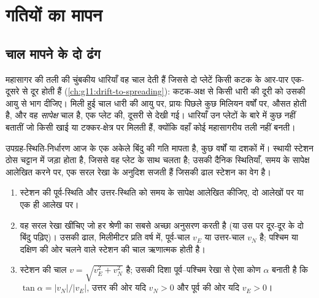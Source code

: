 \section{गतियों का मापन}

\subsection{चाल मापने के दो ढंग}

महासागर की तली की चुंबकीय धारियाँ वह चाल देती हैं जिससे दो प्लेटें
किसी कटक के आर-पार एक-दूसरे से दूर होती हैं (\cref{ch:g11:drift-to-spreading}): कटक-अक्ष से किसी धारी की
दूरी को उसकी आयु से भाग दीजिए। मिली हुई चाल धारी की आयु पर, प्रायः
पिछले कुछ मिलियन वर्षों पर, औसत होती है, और वह
\emph{सापेक्ष} चाल है, एक प्लेट की, दूसरी से देखी गई। धारियाँ
उन प्लेटों के बारे में कुछ नहीं बतातीं जो किसी खाई या टक्कर-क्षेत्र पर मिलती हैं, क्योंकि वहाँ
कोई महासागरीय तली नहीं बनती।

उपग्रह-स्थिति-निर्धारण आज के एक अकेले बिंदु की गति मापता है, कुछ
वर्षों या दशकों में। स्थायी स्टेशन ठोस चट्टान में जड़ा होता है, जिससे
वह प्लेट के साथ चलता है; उसकी दैनिक स्थितियाँ, समय के सापेक्ष आलेखित करने पर,
एक सरल रेखा के अनुदिश सजती हैं जिसकी ढाल स्टेशन का वेग है।

\begin{method}[स्थिति-निर्धारण की समय-श्रेणी से दर]\label{met:g11:plate-motions:rate}
\begin{enumerate}
  \item स्टेशन की पूर्व-स्थिति और उत्तर-स्थिति को समय के सापेक्ष
        आलेखित कीजिए, दो आलेखों पर या एक ही आलेख पर।
  \item वह सरल रेखा खींचिए जो हर श्रेणी का सबसे अच्छा अनुसरण करती है (या उस पर दूर-दूर के दो
        बिंदु पढ़िए)। उसकी ढाल, मिलीमीटर प्रति वर्ष में,
        पूर्व-चाल $v_E$ या उत्तर-चाल $v_N$ है; पश्चिम या
        दक्षिण की ओर चलने वाले स्टेशन की चाल ऋणात्मक होती है।
  \item स्टेशन की चाल $v = \sqrt{v_E^2 + v_N^2}$ है; उसकी दिशा
        पूर्व--पश्चिम रेखा से ऐसा कोण $\alpha$ बनाती है कि
        $\tan\alpha = |v_N|/|v_E|$, उत्तर की ओर यदि $v_N > 0$ और
        पूर्व की ओर यदि $v_E > 0$।
\end{enumerate}
\end{method}

